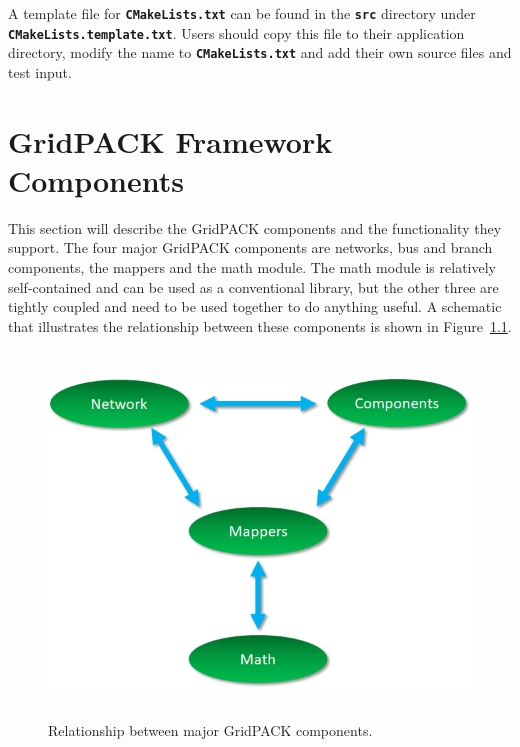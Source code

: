 \documentclass[12pt]{report} %
\begin{document}
A template file for \texttt{\textbf{CMakeLists.txt}} can be found in the \texttt{\textbf{src}} directory under \texttt{\textbf{CMakeLists.template.txt}}. Users should copy this file to their application directory, modify the name to \texttt{\textbf{CMakeLists.txt}} and add their own source files and test input.

\chapter{GridPACK Framework Components}

This section will describe the GridPACK components and the functionality they support. The four major GridPACK components are networks, bus and branch components, the mappers and the math module. The math module is relatively self-contained and can be used as a conventional library, but the other three are tightly coupled and need to be used together to do anything useful. A schematic that illustrates the relationship between these components is shown in Figure~\ref{fig:fig-1}.

\begin{figure}
  \centering
    \includegraphics*[width=6in, height=3.81in, keepaspectratio=true]{Fig1-Relationship-Grid-components}
  \caption{Relationship between major GridPACK components.}
  \label{fig:fig-1}
\end{figure}


\end{document}

